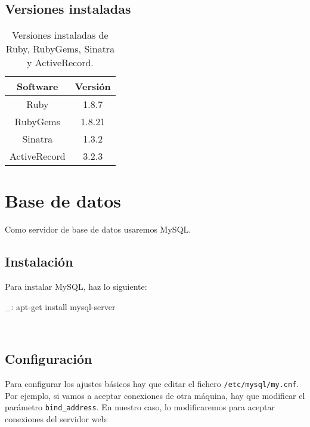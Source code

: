 \subsection{Versiones instaladas}

\begin{table}[!htbp]
\centering
   \begin{tabular}{|c|c|}
      \hline
      \textbf{Software} & \textbf{Versión} \\ \hline
      Ruby & 1.8.7 \\ \hline
      RubyGems & 1.8.21 \\ \hline
      Sinatra & 1.3.2 \\ \hline
      ActiveRecord & 3.2.3 \\ \hline
   \end{tabular}
\caption{Versiones instaladas de Ruby, RubyGems, Sinatra y ActiveRecord.}
\label{table:web-mysql-versions}
\end{table}




\section{Base de datos}


Como servidor de base de datos usaremos MySQL.


\subsection{Instalación}

Para instalar MySQL, haz lo siguiente:

\begin{bashcode}
_: apt-get install mysql-server
\end{bashcode}
\\


\subsection{Configuración}

Para configurar los ajustes básicos hay que editar el fichero \texttt{/etc/mysql/my.cnf}. Por ejemplo, si vamos a aceptar conexiones de otra máquina, hay que modificar el parámetro \texttt{bind\_address}. En nuestro caso, lo modificaremos para aceptar conexiones del servidor web:

